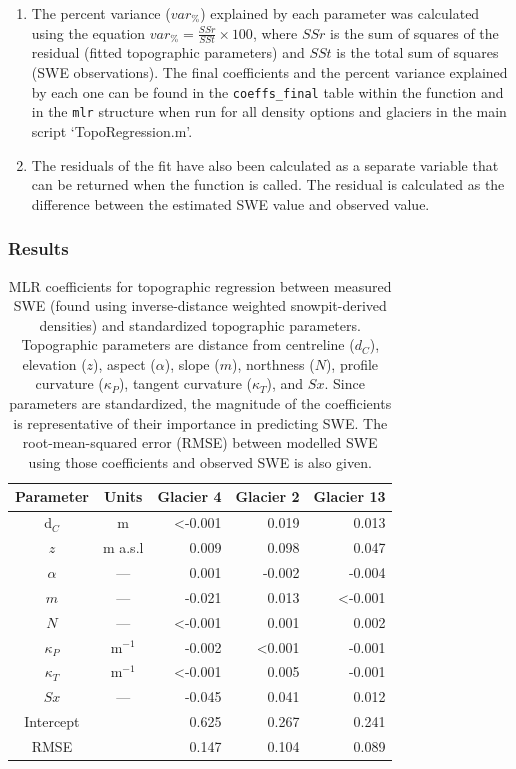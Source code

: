 \documentclass[12pt]{article}
\newcommand{\params}{Topographic parameters are distance from centreline ($d_C$), elevation ($z$), aspect ($\alpha$), slope ($m$), northness ($N$), profile curvature ($\kappa_P$), tangent curvature ($\kappa_T$), and $Sx$. }
\begin{document}
\begin{enumerate}
\item The percent variance ($var_\%$) explained by each parameter was calculated using the equation $var_\% = \frac{SSr}{SSt}\times 100$, where $SSr$ is the sum of squares of the residual (fitted topographic parameters) and $SSt$ is the total sum of squares (SWE observations). The final coefficients and the percent variance explained by each one can be found in the \texttt{coeffs\_final} table within the function and in the \texttt{mlr} structure when run for all density options and glaciers in the main script `TopoRegression.m'.

\item The residuals of the fit have also been calculated as a separate variable that can be returned when the function is called. The residual is calculated as the difference between the estimated SWE value and observed value. 
\end{enumerate}


\subsubsection{Results}

\begin{table}
\centering
\caption{MLR coefficients for topographic regression between measured SWE (found using inverse-distance weighted snowpit-derived densities) and standardized topographic parameters. \params  Since parameters are standardized, the magnitude of the coefficients is representative of their importance in predicting SWE. The root-mean-squared error (RMSE) between modelled SWE using those coefficients and observed SWE is also given.}
\label{tab:MLRcoeff}
\begin{tabular}{ccrrr}
 Parameter & Units & \textbf{Glacier 4} & \textbf{Glacier 2} & \textbf{Glacier 13} \\ \hline
d$_C$ 			&m&  \textless-0.001		& 0.019 					& 0.013 \\
$z$ 				&m a.s.l & 0.009 						& 0.098					& 0.047 \\
$\alpha$ 		& ---& 0.001 						& -0.002 					& -0.004 \\
$m$ 			& ---& -0.021 						& 0.013					 &  \textless-0.001 \\
$N$ 				& ---& \textless-0.001		  	& 0.001 					& 0.002 \\
$\kappa_P$ &m$^{-1}$& -0.002 						& \textless0.001 		& -0.001 \\
$\kappa_T$&m$^{-1}$ & \textless-0.001 		& 0.005 					& -0.001 \\
$Sx$ 			& ---& -0.045 						& 0.041 					&0.012 \\
Intercept 		&& 0.625 						& 0.267 					& 0.241 \\ \hline
RMSE 			&& 0.147						& 0.104 					& 0.089
\end{tabular}
\end{table}
\end{document}
